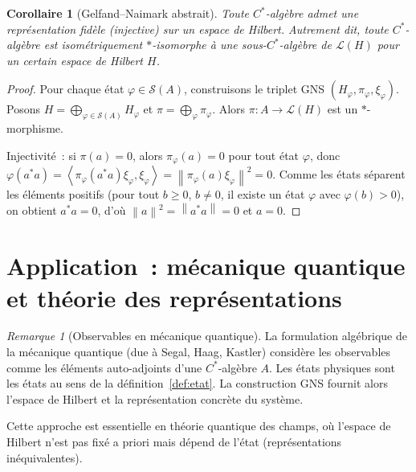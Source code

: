 \documentclass[a4paper,12pt]{book}
\newcommand{\norm}[1]{\left\| #1 \right\|}
\newcommand{\inner}[2]{\left\langle #1, #2 \right\rangle}
\theoremstyle{definition}
\theoremstyle{plain}
\newtheorem{corollaire}[definition]{Corollaire}
\theoremstyle{remark}
\newtheorem{remarque}[definition]{Remarque}
\begin{document}
\begin{corollaire}[Gelfand--Naimark abstrait]
\label{cor:gelfand-naimark-abstrait}
Toute $C^*$-algèbre admet une représentation fidèle (injective) sur un espace de Hilbert.
Autrement dit, toute $C^*$-algèbre est isométriquement $*$-isomorphe à une sous-$C^*$-algèbre
de $\mathcal{L}(H)$ pour un certain espace de Hilbert $H$.
\end{corollaire}

\begin{proof}
Pour chaque état $\varphi \in \mathcal{S}(A)$, construisons le triplet GNS
$(H_\varphi, \pi_\varphi, \xi_\varphi)$. Posons
$H = \bigoplus_{\varphi \in \mathcal{S}(A)} H_\varphi$ et
$\pi = \bigoplus_\varphi \pi_\varphi$. Alors $\pi : A \to \mathcal{L}(H)$ est un
$*$-morphisme.

Injectivité~: si $\pi(a) = 0$, alors $\pi_\varphi(a) = 0$ pour tout état $\varphi$,
donc $\varphi(a^*a) = \inner{\pi_\varphi(a^*a)\xi_\varphi}{\xi_\varphi} = \norm{\pi_\varphi(a)\xi_\varphi}^2 = 0$.
Comme les états séparent les éléments positifs (pour tout $b \ge 0$, $b \neq 0$, il
existe un état $\varphi$ avec $\varphi(b) > 0$), on obtient $a^*a = 0$, d'où
$\norm{a}^2 = \norm{a^*a} = 0$ et $a = 0$.
\end{proof}

\section{Application~: mécanique quantique et théorie des représentations}

\begin{remarque}[Observables en mécanique quantique]
La formulation algébrique de la mécanique quantique (due à Segal, Haag, Kastler)
considère les observables comme les éléments auto-adjoints d'une $C^*$-algèbre $A$. Les
états physiques sont les états au sens de la définition~\ref{def:etat}. La construction
GNS fournit alors l'espace de Hilbert et la représentation concrète du système.

Cette approche est essentielle en théorie quantique des champs, où l'espace de Hilbert
n'est pas fixé a priori mais dépend de l'état (représentations inéquivalentes).
\end{remarque}
\end{document}
